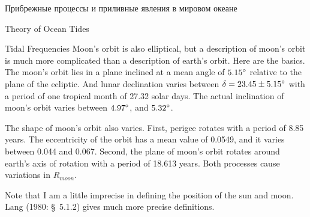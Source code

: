\begin{chapter}{Прибрежные процессы и приливные явления в мировом океане}
\begin{section}{Theory of Ocean Tides}
\begin{paragraph}{Tidal Frequencies}
Moon's orbit is also elliptical, but a description of moon's orbit is
much more complicated than a description of earth's orbit. Here are
the basics. The moon's orbit lies in a plane inclined at a mean angle
of ${5.15}^\circ$ relative to the plane of the ecliptic. And lunar
declination varies between $\delta = {23.45 \pm 5.15}^\circ$ with a
period of one tropical month of 27.32 solar days. The actual
inclination of moon's orbit varies between ${4.97}^\circ$, and
${5.32}^\circ$.
%

The shape of moon's orbit also varies. First, perigee rotates with a
period of 8.85 years. The eccentricity of the orbit has a mean value
of 0.0549, and it varies between 0.044 and 0.067. Second, the plane of
moon's orbit rotates around earth's axis of rotation with a period of
18.613 years. Both processes cause variations in $R_{moon}$.
%

Note that I am a little imprecise in defining the position of the sun
and moon.  Lang (1980: \S \ 5.1.2) gives much more precise
definitions.
%


\end{paragraph}
\end{section}
\end{chapter}
